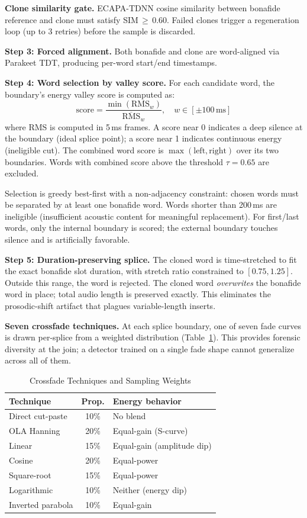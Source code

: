 \documentclass[conference]{IEEEtran}
\begin{document}
\textbf{Clone similarity gate.} ECAPA-TDNN cosine similarity between bonafide reference and clone must satisfy SIM\,$\geq$\,0.60. Failed clones trigger a regeneration loop (up to 3 retries) before the sample is discarded.

\textbf{Step 3: Forced alignment.} Both bonafide and clone are word-aligned via Parakeet TDT, producing per-word start/end timestamps.

\textbf{Step 4: Word selection by valley score.} For each candidate word, the boundary's energy valley score is computed as:
\begin{equation}
\text{score} = \frac{\min(\text{RMS}_w)}{\overline{\text{RMS}}_w}, \quad w \in [\pm 100\,\text{ms}]
\label{eq:valley}
\end{equation}
where RMS is computed in 5\,ms frames. A score near 0 indicates a deep silence at the boundary (ideal splice point); a score near 1 indicates continuous energy (ineligible cut). The combined word score is $\max(\text{left}, \text{right})$ over its two boundaries. Words with combined score above the threshold $\tau = 0.65$ are excluded.

Selection is greedy best-first with a non-adjacency constraint: chosen words must be separated by at least one bonafide word. Words shorter than 200\,ms are ineligible (insufficient acoustic content for meaningful replacement). For first/last words, only the internal boundary is scored; the external boundary touches silence and is artificially favorable.

\textbf{Step 5: Duration-preserving splice.} The cloned word is time-stretched to fit the exact bonafide slot duration, with stretch ratio constrained to $[0.75, 1.25]$. Outside this range, the word is rejected. The cloned word \emph{overwrites} the bonafide word in place; total audio length is preserved exactly. This eliminates the prosodic-shift artifact that plagues variable-length inserts.

\textbf{Seven crossfade techniques.} At each splice boundary, one of seven fade curves is drawn per-splice from a weighted distribution (Table~\ref{tab:fades}). This provides forensic diversity at the join; a detector trained on a single fade shape cannot generalize across all of them.

\begin{table}[t]
\caption{Crossfade Techniques and Sampling Weights}
\label{tab:fades}
\centering
\small
\begin{tabular}{lcl}
\toprule
\textbf{Technique} & \textbf{Prop.} & \textbf{Energy behavior} \\
\midrule
Direct cut-paste & 10\% & No blend \\
OLA Hanning & 20\% & Equal-gain (S-curve) \\
Linear & 15\% & Equal-gain (amplitude dip) \\
Cosine & 20\% & Equal-power \\
Square-root & 15\% & Equal-power \\
Logarithmic & 10\% & Neither (energy dip) \\
Inverted parabola & 10\% & Equal-gain \\
\bottomrule
\end{tabular}
\end{table}
\end{document}
